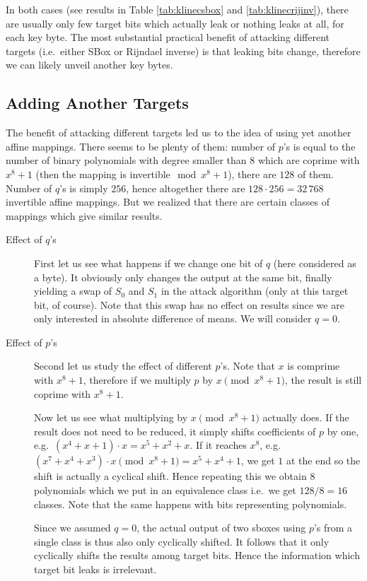 In both cases (see results in Table \ref{tab:klinecsbox} and \ref{tab:klinecrijinv}), there are usually only few target bits which actually leak or nothing leaks at all, for each key byte. The most substantial practical benefit of attacking different targets (i.e.\ either SBox or Rijndael inverse) is that leaking bits change, therefore we can likely unveil another key bytes.

\subsection{Adding Another Targets}
\label{sec:16targets}

The benefit of attacking different targets led us to the idea of using yet another affine mappings. There seems to be plenty of them: number of $p$'s is equal to the number of binary polynomials with degree smaller than $8$ which are coprime with $x^8+1$ (then the mapping is invertible$\mod{x^8+1}$), there are $128$ of them. Number of $q$'s is simply $256$, hence altogether there are $128\cdot 256 = 32\,768$ invertible affine mappings. But we realized that there are certain classes of mappings which give similar results.

\begin{description}
\item[Effect of $q$'s]
First let us see what happens if we change one bit of $q$ (here considered as a byte). It obviously only changes the output at the same bit, finally yielding a swap of $S_0$ and $S_1$ in the attack algorithm (only at this target bit, of course). Note that this swap has no effect on results since we are only interested in absolute difference of means. We will consider $q = 0$.

\item[Effect of $p$'s]
Second let us study the effect of different $p$'s. Note that $x$ is comprime with $x^8+1$, therefore if we multiply $p$ by $x\pmod{x^8+1}$, the result is still coprime with $x^8+1$.

Now let us see what multiplying by $x\pmod{x^8+1}$ actually does. If the result does not need to be reduced, it simply shifts coefficients of $p$ by one, e.g.\ $(x^4 + x + 1) \cdot x = x^5 + x^2 + x$. If it reaches $x^8$, e.g.\ $(x^7 + x^4 + x^3) \cdot x \pmod{x^8+1} = x^5 + x^4 + 1$, we get $1$ at the end so the shift is actually a cyclical shift. Hence repeating this we obtain $8$ polynomials which we put in an equivalence class i.e.\ we get $128/8=16$ classes. Note that the same happens with bits representing polynomials.

Since we assumed $q = 0$, the actual output of two sboxes using $p$'s from a single class is thus also only cyclically shifted. It follows that it only cyclically shifts the results among target bits. Hence the information which target bit leaks is irrelevant.
\end{description}

